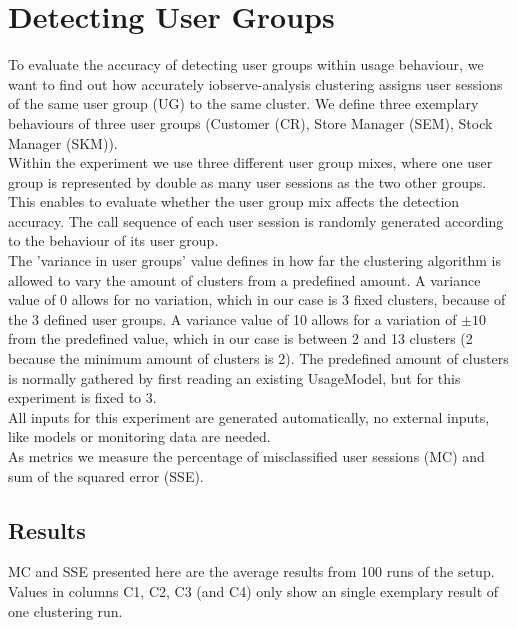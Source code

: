 \documentclass[10pt,a4paper]{article}
\begin{document}
	\section{Detecting User Groups}
	To evaluate the accuracy of detecting user groups within usage behaviour, we want to find out how accurately iobserve-analysis clustering assigns user sessions of the same user group (UG) to the same cluster. We define three exemplary behaviours of three user groups (Customer (CR), Store Manager (SEM), Stock Manager (SKM)).\\
	Within the experiment we use three different user group mixes, where one user group is represented by double as many user sessions as the two other groups. This enables to evaluate whether the user group mix affects the detection accuracy. The call sequence of each user session is randomly generated according to the behaviour of its user group.\\
	The 'variance in user groups' value defines in how far the clustering algorithm is allowed to vary the amount of clusters from a predefined amount. A variance value of 0 allows for no variation, which in our case is 3 fixed clusters, because of the 3 defined user groups. A variance value of 10 allows for a variation of $\pm 10 $ from the predefined value, which in our case is between 2 and 13 clusters (2 because the minimum amount of clusters is 2). The predefined amount of clusters is normally gathered by first reading an existing UsageModel, but for this experiment is fixed to 3.\\
	All inputs for this experiment are generated automatically, no external inputs, like models or monitoring data are needed.\\
	As metrics we measure the percentage of misclassified user sessions (MC) and sum of the squared error (SSE). 
	\subsection{Results}
	MC and SSE presented here are the average results from 100 runs of the setup. Values in columns C1, C2, C3 (and C4) only show an single exemplary result of one clustering run.
\end{document}
